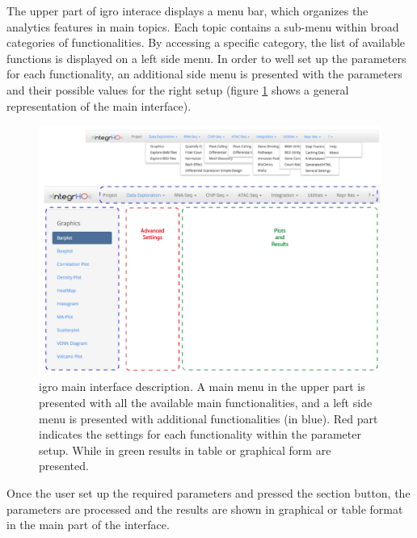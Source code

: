 The upper part of \gls{igro} interace displays a menu bar, which organizes the analytics features in main topics.
Each topic contains a sub-menu within broad categories of functionalities.
By accessing a specific category, the list of available functions is displayed on a left side menu.
In order to well set up the parameters for each functionality, an additional side menu is presented with the parameters and their possible values for the right setup (figure \ref{fig:integrhomain} shows a general representation of the main interface).

\begin{figure}[ht]
\centering
\includegraphics[width=\textwidth, keepaspectratio]{img/integrho/interface.png}
\caption[IntegrHO main interface]{\gls{igro} main interface description. A main menu in the upper part is presented with all the available main functionalities, and a left side menu is presented with additional functionalities (in blue). Red part indicates the settings for each functionality within the parameter setup. While in green results in table or graphical form are presented.}
\label{fig:integrhomain}
\end{figure}

Once the user set up the required parameters and pressed the section button, the parameters are processed and the results are shown in graphical or table format in the main part of the interface.

